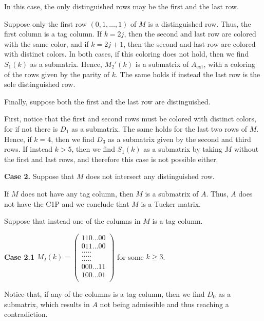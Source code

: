 \documentclass[a4paper,10pt]{report}
\theoremstyle{plain}
\theoremstyle{remark}
\theoremstyle{plain}
\newcommand*{\ext}{\mathrm{ext}}
\begin{document}
{\vspace{2mm}

In this case, the only distinguished rows may be the first and the last row.

Suppose only the first row $(0, 1, \ldots, 1)$ of $M$ is a distinguished row. Thus, the first column is a tag column. 
If $k = 2j$, then the second and last row are colored with the same color, and if $k = 2j+1$, then the second and last row are colored with distinct colors. In both cases, if this coloring does not hold, then we find $S_1(k)$ as a submatrix.
Hence, $M_2'(k)$ is a submatrix of $A_{\ext}$, with a coloring of the rows given by the parity of $k$. The same holds if instead the last row is the sole distinguished row.


Finally, suppose both the first and the last row are distinguished.

First, notice that the first and second rows must be colored with distinct colors, for if not there is $D_1$ as a submatrix. The same holds for the last two rows of $M$.
Hence, if $k = 4$, then we find $D_3$ as a submatrix given by the second and third rows. If instead $k > 5$, then we find $S_1(k)$ as a submatrix by taking $M$ without the first and last rows, and therefore this case is not possible either.


\vspace{3mm}
\textbf{Case 2.} Suppose that $M$ does not intersect any distinguished row.

If $M$ does not have any tag column, then $M$ is a submatrix of $A$. Thus, $A$ does not have the C1P and we conclude that $M$ is a Tucker matrix.

Suppose that instead one of the columns in $M$ is a tag column.

\vspace{2mm}
\textbf{Case 2.1} $M_I(k) = \begin{pmatrix}
				110...00\\
				011...00\\
				.   .   .   .   . \\
				.   .   .   .   . \\
				.   .   .   .   . \\
				000...11\\
				100...01\\
			\end{pmatrix}$ for some $k \geq 3$.

\vspace{2mm}
Notice that, if any of the columns is a tag column, then we find $D_0$ as a submatrix, which results in $A$ not being admissible and thus reaching a contradiction.

}
\end{document}
